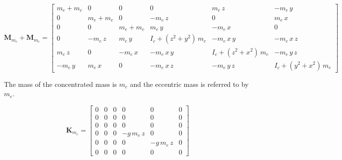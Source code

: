 \documentclass{article}
\begin{document}
\begin{small}
    \begin{equation}
        \mathbf{M}_{m_c} + \mathbf{M}_{m_e}  = 
        \begin{bmatrix}
         m_{e}+m_{c}   & 0             & 0             & 0                                             & m_{e}\,z                                  & -m_{e}\,y           \\ 
         0             & m_{e}+m_{c}   & 0             & -m_{e}\,z                                 & 0                                             & m_{e}\,x            \\ 
         0             & 0              & m_{e}+m_{c}   & m_{e}\,y                                     & -m_{e}\,x                                    & 0                    \\ 
         0             & -m_{e}\,z & m_{e}\,y     & I_{c}+\left({z}^2+{y   }^2\right)\,m_{e} & -m_{e}\,x   \,y                             & -m_{e}\,x   \,z \\ 
         m_{e}\,z  & 0             & -m_{e}\,x    & -m_{e}\,x   \,y                             & I_{c}+\left({z}^2+{x   }^2\right)\,m_{e} & -m_{e}\,y   \,z \\
         -m_{e}\,y    & m_{e}\,x     & 0             & -m_{e}\,x   \,z                          & -m_{e}\,y   \,z                          & I_{c}+\left({y   }^2+{x   }^2\right)\,m_{e} 
        \end{bmatrix}
        \label{eq:fea:Mtop}
    \end{equation}
\end{small}


The mass of the concentrated mass is $m_c$ and the eccentric mass is referred to by $m_e$. 

\begin{small}
    \begin{equation}
        \mathbf{K}_{m_e} =
        \begin{bmatrix}
       0 & 0 & 0 &         0        &        0         & 0 \\ 
       0 & 0 & 0 &         0        &        0         & 0 \\ 
       0 & 0 & 0 &         0        &        0         & 0 \\ 
       0 & 0 & 0 & -g\,m_{e}\,z     &        0         & 0 \\ 
       0 & 0 & 0 &         0        & -g\,m_{e}\,z     & 0 \\ 
       0 & 0 & 0 &         0        &        0         & 0
        \end{bmatrix}
        \label{eq:fea:K_m_ecc}
    \end{equation}
\end{small}
\end{document}
